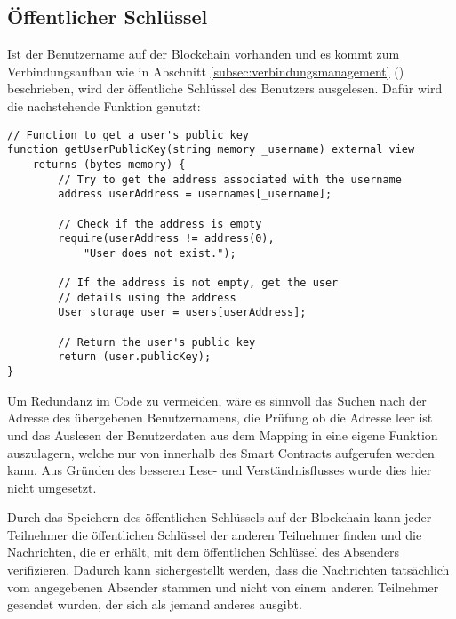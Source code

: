 \subsection{Öffentlicher Schlüssel}
\label{subsec:contract_oeffentlicher_schluessel}

Ist der Benutzername auf der Blockchain vorhanden und es kommt zum Verbindungsaufbau wie in Abschnitt \ref{subsec:verbindungsmanagement} () beschrieben, wird der öffentliche Schlüssel des Benutzers ausgelesen. Dafür wird die nachstehende Funktion genutzt:

\begin{lstlisting}[language=Solidity, caption={Suche nach einem öffentlichen Schlüssel auf der Blockchain},captionpos=b]
// Function to get a user's public key
function getUserPublicKey(string memory _username) external view 
    returns (bytes memory) {
        // Try to get the address associated with the username
        address userAddress = usernames[_username];

        // Check if the address is empty
        require(userAddress != address(0), 
            "User does not exist.");

        // If the address is not empty, get the user 
        // details using the address
        User storage user = users[userAddress];

        // Return the user's public key
        return (user.publicKey);
}
\end{lstlisting}

\noindent Um Redundanz im Code zu vermeiden, wäre es sinnvoll das Suchen nach der Adresse des übergebenen Benutzernamens, die Prüfung ob die Adresse leer ist und das Auslesen der Benutzerdaten aus dem Mapping in eine eigene Funktion auszulagern, welche nur von innerhalb des Smart Contracts aufgerufen werden kann. Aus Gründen des besseren Lese- und Verständnisflusses wurde dies hier nicht umgesetzt.

Durch das Speichern des öffentlichen Schlüssels auf der Blockchain kann jeder Teilnehmer die öffentlichen Schlüssel der anderen Teilnehmer finden und die Nachrichten, die er erhält, mit dem öffentlichen Schlüssel des Absenders verifizieren. Dadurch kann sichergestellt werden, dass die Nachrichten tatsächlich vom angegebenen Absender stammen und nicht von einem anderen Teilnehmer gesendet wurden, der sich als jemand anderes ausgibt.


